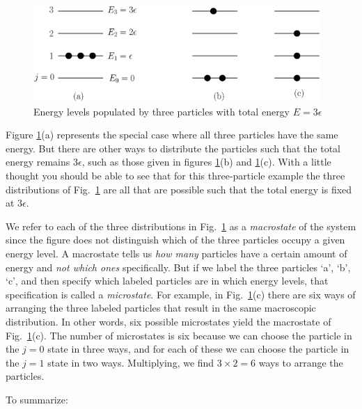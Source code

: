\begin{figure}[tbp]
\begin{center}
\includegraphics[width=4.3in]{statistical_mechanics/levels_e3.eps}
\end{center}
\caption{Energy levels populated by three particles with total energy 
$E = 3\epsilon$}
\label{fig:levels_e3}
\end{figure}     
     
Figure \ref{fig:levels_e3}(a) represents the special case where all
three particles have the same energy.  But there are other ways to
distribute the particles such that the total energy remains
$3\epsilon$, such as those given in figures \ref{fig:levels_e3}(b) and
\ref{fig:levels_e3}(c).  With a little thought you should be able to
see that for this three-particle example the three distributions of
Fig.~\ref{fig:levels_e3} are all that are possible such that the total
energy is fixed at $3\epsilon$.
        
We refer to each of the three distributions in
Fig.~\ref{fig:levels_e3} as a {\em macrostate} of the system since the
figure does not distinguish which of the three particles occupy a
given energy level.  A macrostate tells us {\em how many} particles
have a certain amount of energy and {\em not which ones} specifically.
But if we label the three particles `a', `b', `c', and then specify
which labeled particles are in which energy levels, that specification
is called a {\em microstate}.  For example, in
Fig.~\ref{fig:levels_e3}(c) there are six ways of arranging the three
labeled particles that result in the same macroscopic distribution.
In other words, six possible microstates yield the macrostate of
Fig.~\ref{fig:levels_e3}(c).  The number of microstates is six because
we can choose the particle in the $j = 0$ state in three ways, and for
each of these we can choose the particle in the $j = 1$ state in two
ways.  Multiplying, we find $3 \times 2 = 6$ ways to arrange the
particles.
        
To summarize:
        
        
